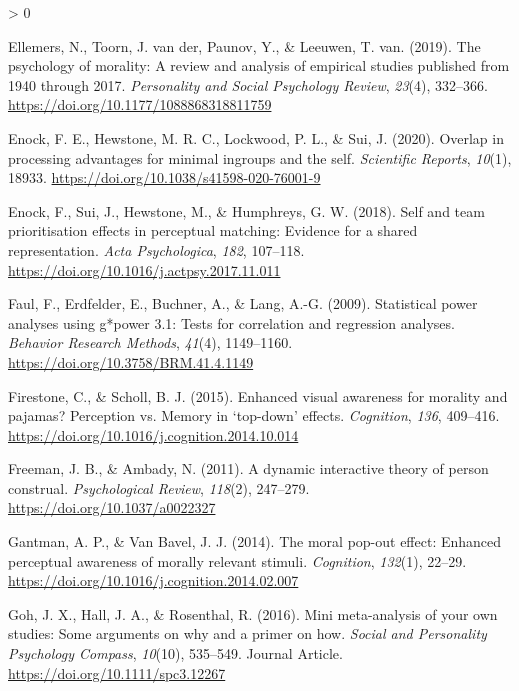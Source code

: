 \documentclass[
  english,
  man]{apa6}
\newlength{\cslhangindent}
\newenvironment{CSLReferences}[2] %
 {%
  \setlength{\parindent}{0pt}
  \ifodd #1 \everypar{\setlength{\hangindent}{\cslhangindent}}\ignorespaces\fi
  \ifnum #2 > 0
  \setlength{\parskip}{#2\baselineskip}
  \fi
 }%
 {}
\begin{document}
\begin{CSLReferences}{1}{0}
\leavevmode\hypertarget{ref-ellemers_psychology_2019}{}%
Ellemers, N., Toorn, J. van der, Paunov, Y., \& Leeuwen, T. van. (2019). The psychology of morality: A review and analysis of empirical studies published from 1940 through 2017. \emph{Personality and Social Psychology Review}, \emph{23}(4), 332--366. \url{https://doi.org/10.1177/1088868318811759}

\leavevmode\hypertarget{ref-enock_overlap_2020}{}%
Enock, F. E., Hewstone, M. R. C., Lockwood, P. L., \& Sui, J. (2020). Overlap in processing advantages for minimal ingroups and the self. \emph{Scientific Reports}, \emph{10}(1), 18933. \url{https://doi.org/10.1038/s41598-020-76001-9}

\leavevmode\hypertarget{ref-enock_self_2018}{}%
Enock, F., Sui, J., Hewstone, M., \& Humphreys, G. W. (2018). Self and team prioritisation effects in perceptual matching: Evidence for a shared representation. \emph{Acta Psychologica}, \emph{182}, 107--118. \url{https://doi.org/10.1016/j.actpsy.2017.11.011}

\leavevmode\hypertarget{ref-faul_statistical_2009}{}%
Faul, F., Erdfelder, E., Buchner, A., \& Lang, A.-G. (2009). Statistical power analyses using g*power 3.1: Tests for correlation and regression analyses. \emph{Behavior Research Methods}, \emph{41}(4), 1149--1160. \url{https://doi.org/10.3758/BRM.41.4.1149}

\leavevmode\hypertarget{ref-firestone_enhanced_2015}{}%
Firestone, C., \& Scholl, B. J. (2015). Enhanced visual awareness for morality and pajamas? Perception vs. Memory in {`top-down'} effects. \emph{Cognition}, \emph{136}, 409--416. \url{https://doi.org/10.1016/j.cognition.2014.10.014}

\leavevmode\hypertarget{ref-freeman_dynamic_2011}{}%
Freeman, J. B., \& Ambady, N. (2011). A dynamic interactive theory of person construal. \emph{Psychological Review}, \emph{118}(2), 247--279. \url{https://doi.org/10.1037/a0022327}

\leavevmode\hypertarget{ref-gantman_moral_2014}{}%
Gantman, A. P., \& Van Bavel, J. J. (2014). The moral pop-out effect: Enhanced perceptual awareness of morally relevant stimuli. \emph{Cognition}, \emph{132}(1), 22--29. \url{https://doi.org/10.1016/j.cognition.2014.02.007}

\leavevmode\hypertarget{ref-Goh_2016_mini}{}%
Goh, J. X., Hall, J. A., \& Rosenthal, R. (2016). Mini meta-analysis of your own studies: Some arguments on why and a primer on how. \emph{Social and Personality Psychology Compass}, \emph{10}(10), 535--549. Journal Article. \url{https://doi.org/10.1111/spc3.12267}


\end{CSLReferences}
\end{document}
